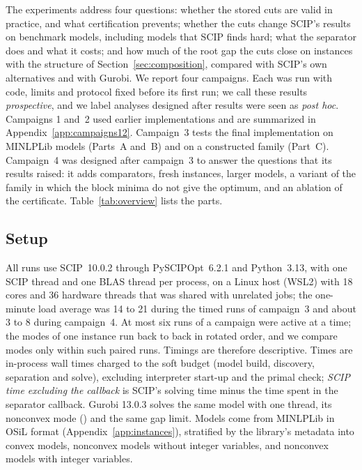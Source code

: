 The experiments address four questions: whether the stored cuts are valid in
practice, and what certification prevents; whether the cuts change SCIP's
results on benchmark models, including models that SCIP finds hard; what the
separator does and what it costs; and how much of the root gap the cuts close
on instances with the structure of Section~\ref{sec:composition}, compared
with SCIP's own alternatives and with Gurobi. We report four campaigns. Each
was run with code, limits and protocol fixed before its first run; we call
these results \emph{prospective}, and we label analyses designed after
results were seen as \emph{post hoc}. Campaigns 1 and~2 used earlier
implementations and are summarized in Appendix~\ref{app:campaigns12}.
Campaign~3 tests the final implementation on MINLPLib models (Parts~A and~B)
and on a constructed family (Part~C). Campaign~4 was designed after campaign~3
to answer the questions that its results raised: it adds comparators, fresh
instances, larger models, a variant of the family in which the block minima
do not give the optimum, and an ablation of the certificate. Table~\ref{tab:overview} lists the parts.

\subsection{Setup}\label{sec:setup}

All runs use SCIP~10.0.2 through PySCIPOpt~6.2.1 and Python~3.13, with one
SCIP thread and one BLAS thread per process, on a Linux host (WSL2) with 18
cores and 36 hardware threads that was shared with unrelated jobs; the
one-minute load average was 14 to 21 during the timed runs of campaign~3 and
about 3 to 8 during campaign~4. At most six runs of a campaign were active at a
time; the modes of one instance run back to back in
rotated order, and we compare modes only within such paired runs. Timings are
therefore descriptive. Times are in-process wall times charged to the soft
budget (model build, discovery, separation and solve), excluding interpreter
start-up and the primal check; \emph{SCIP time excluding the callback} is
SCIP's solving time minus the time spent in the separator callback. Gurobi
13.0.3 \citep{Gurobi13} solves the same model with one thread, its nonconvex
mode () and the same gap limit. Models
come from MINLPLib \citep{BussieckDrudMeeraus2003,Vigerske2026MINLPLib} in
OSiL format (Appendix~\ref{app:instances}), stratified by the library's
metadata into convex models, nonconvex models without integer variables, and
nonconvex models with integer variables.

